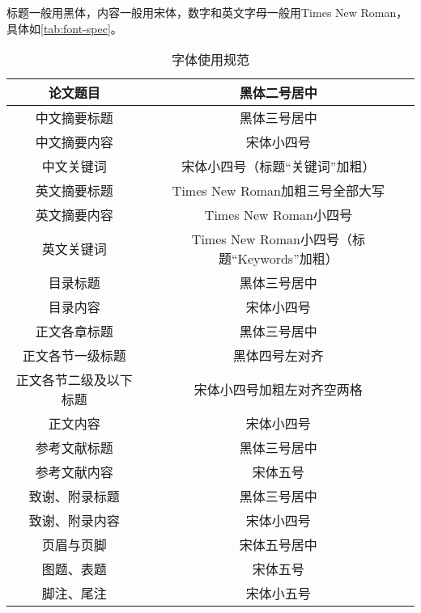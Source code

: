 标题一般用黑体，内容一般用宋体，数字和英文字母一般用Times New Roman，具体如\autoref{tab:font-spec}。

\begin{table}[]
    \caption{字体使用规范}
    \begin{tabular}{|c|c|}
        \hline
        论文题目               & 黑体二号居中                                  \\ \hline
        中文摘要标题           & 黑体三号居中                                  \\ \hline
        中文摘要内容           & 宋体小四号                                    \\ \hline
        中文关键词             & 宋体小四号（标题``关键词''加粗）              \\ \hline
        英文摘要标题           & Times New Roman加粗三号全部大写               \\ \hline
        英文摘要内容           & Times New Roman小四号                         \\ \hline
        英文关键词             & Times New Roman小四号（标题``Keywords''加粗） \\ \hline
        目录标题               & 黑体三号居中                                  \\ \hline
        目录内容               & 宋体小四号                                    \\ \hline
        正文各章标题           & 黑体三号居中                                  \\ \hline
        正文各节一级标题       & 黑体四号左对齐                                \\ \hline
        正文各节二级及以下标题 & 宋体小四号加粗左对齐空两格                    \\ \hline
        正文内容               & 宋体小四号                                    \\ \hline
        参考文献标题           & 黑体三号居中                                  \\ \hline
        参考文献内容           & 宋体五号                                      \\ \hline
        致谢、附录标题         & 黑体三号居中                                  \\ \hline
        致谢、附录内容         & 宋体小四号                                    \\ \hline
        页眉与页脚             & 宋体五号居中                                  \\ \hline
        图题、表题             & 宋体五号                                      \\ \hline
        脚注、尾注             & 宋体小五号                                    \\ \hline
    \end{tabular}
    \label{tab:font-spec}
\end{table}


